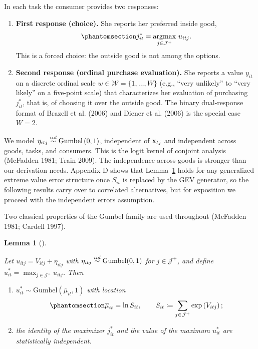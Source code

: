 \documentclass[
  letterpaper,
  DIV=11,
  numbers=noendperiod]{scrartcl}
\theoremstyle{plain}
\newtheorem{lemma}{Lemma}[section]
\theoremstyle{plain}
\theoremstyle{remark}
\begin{document}
In each task the consumer provides two responses:

\begin{enumerate}
\def\labelenumi{\arabic{enumi}.}
\item
  \textbf{First response (choice).} She reports her preferred inside
  good, \begin{equation}\protect\phantomsection\label{eq-firstresponse}{
  j^*_{it} = \underset{j \in \mathcal{J}^+}{\operatorname{arg max}} \ u_{itj}.
  }\end{equation} This is a forced choice: the outside good is not among
  the options.
\item
  \textbf{Second response (ordinal purchase evaluation).} She reports a
  value \(y_{it}\) on a discrete ordinal scale
  \(w \in \mathcal{W} = \lbrace 1, \ldots, W \rbrace\) (e.g., ``very
  unlikely'' to ``very likely'' on a five-point scale) that
  characterizes her evaluation of purchasing \(j^*_{it}\), that is, of
  choosing it over the outside good. The binary dual-response format of
  Brazell et al. (2006) and Diener et al. (2006) is the special case
  \(W=2\).
\end{enumerate}

We model \(\eta_{itj} \stackrel{iid}{\sim} \text{Gumbel} \left( 0,1 \right)\),
independent of \(\mathbf{x}_{tj}\) and independent across goods, tasks, and
consumers. This is the logit kernel of conjoint analysis (McFadden 1981;
Train 2009). The independence across goods is stronger than our
derivation needs. Appendix D shows that Lemma~\ref{lem-gumbel} holds for
any generalized extreme value error structure once \(S_{it}\) is
replaced by the GEV generator, so the following results carry over to
correlated alternatives, but for exposition we proceed with the
independent errors assumption.

Two classical properties of the Gumbel family are used throughout
(McFadden 1981; Cardell 1997).

\begin{lemma}[]\protect\hypertarget{lem-gumbel}{}\label{lem-gumbel}

Let \(u_{itj} = V_{itj} + \eta_{itj}\) with
\(\eta_{itj} \stackrel{iid}{\sim} \text{Gumbel}(0,1)\) for \(j \in \mathcal{J}^+\), and
define \(u^*_{it} = \max_{j \in \mathcal{J}^+} u_{itj}\). Then

\begin{enumerate}
\def\labelenumi{(\roman{enumi})}
\item
  \(u^*_{it} \sim \text{Gumbel}\left(\overline{\mu}_{it}, 1\right)\)
  with location
  \begin{equation}\protect\phantomsection\label{eq-max-mu}{
  \overline{\mu}_{it} = \ln S_{it},
  \qquad
  S_{it} \coloneqq \sum_{j\in\mathcal{J}^{+}} \exp \left( V_{itj} \right);
  }\end{equation}
\item
  the \emph{identity} of the maximizer \(j^*_{it}\) and the \emph{value}
  of the maximum \(u^*_{it}\) are statistically independent.
\end{enumerate}

\end{lemma}
\end{document}

